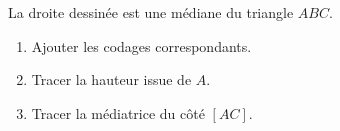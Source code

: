 
\begin{exercice}\label{exosmath-0995}

    La droite dessinée est une médiane du triangle \( ABC\). 
    \begin{enumerate}
        \item
            Ajouter les codages correspondants.
        \item
            Tracer la hauteur issue de \( A\).
        \item
            Tracer la médiatrice du côté \( [AC]\).
    \end{enumerate}

\begin{center}
   
\end{center}
    

\end{exercice}

